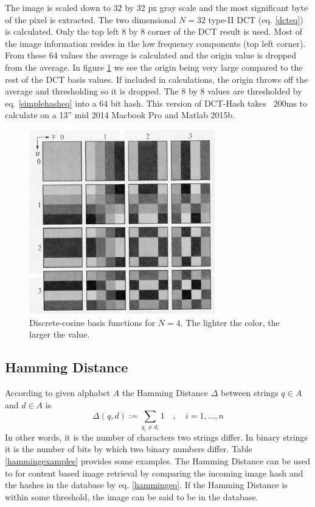 \documentclass[english,12pt,a4paper,pdftex,elec,utf8, table]{aaltothesis}
\begin{document}
The image is scaled down to 32 by 32 px gray scale and the most significant byte of the pixel is extracted. The two dimensional $N=32$ type-II DCT (eq. \ref{dcteq}) is calculated. Only the top left 8 by 8 corner of the DCT result is used. Most of the image information resides in the low frequency components (top left corner). From these 64 values the average is calculated and the origin value is dropped from the average. In figure \ref{dctkernels} we see the origin being very large compared to the rest of the DCT basis values. If included in calculations, the origin throws off the average and thresholding so it is dropped. The 8 by 8 values are thresholded by eq. \ref{simplehasheq} into a 64 bit hash. This version of DCT-Hash takes ~200ms to calculate on a 13'' mid 2014 Macbook Pro and Matlab 2015b.

\begin{figure}[htb]
\begin{center}
\includegraphics[height=8cm]{figures/dct}
\end{center}
\caption{Discrete-cosine basis functions for $N = 4$. The lighter the color, the larger the value. \cite[p. 473]{Gonzalez2002}}
\label{dctkernels}
\end{figure}
\subsection{Hamming Distance}\label{HammingSection}
According to \cite{Hamming1950} given alphabet $A$ the Hamming Distance $\Delta$ between strings $q \in A$ and $d \in A$ is
\begin{equation}\label{hammingeq}
\Delta(q,d):=\sum_{q_i\neq d_i}1\quad,\quad i=1,\ldots,n
\end{equation}
In other words, it is the number of characters two strings differ. In binary strings it is the number of bits by which two binary numbers differ. Table \ref{hammingexamples} provides some examples. The Hamming Distance can be used to for content based image retrieval by comparing the incoming image hash and the hashes in the database by eq. \ref{hammingeq}. If the Hamming Distance is within some threshold, the image can be said to be in the database.
\end{document}
